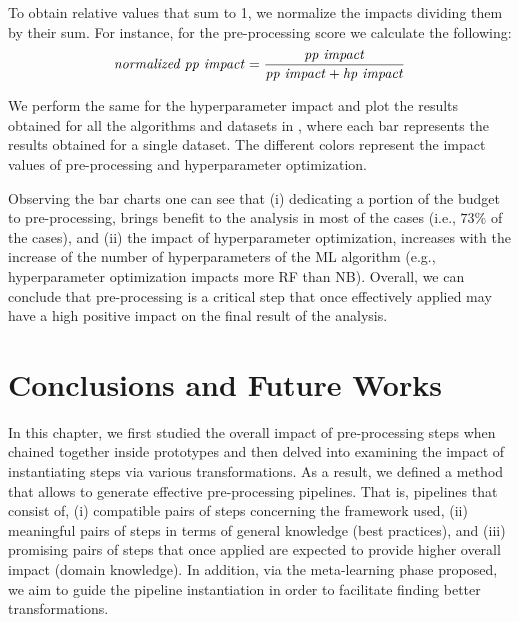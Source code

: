 To obtain relative values that sum to 1, we normalize the impacts dividing them by their sum.
For instance, for the pre-processing score we calculate the following:
\begin{equation*}
    \text{\textit{normalized pp impact}} = \frac{\text{\textit{pp impact}}}
    {\text{\textit{pp impact}} + \text{\textit{hp impact}}}
\end{equation*}


We perform the same for the hyperparameter impact and plot the results obtained for all the algorithms and datasets in , where each bar represents the results obtained for a single dataset.
The different colors represent the impact values of pre-processing and hyperparameter optimization.

Observing the bar charts one can see that (i) dedicating a portion of the budget to pre-processing, brings benefit to the analysis in most of the cases (i.e., $73\%$ of the cases), and (ii) the impact of hyperparameter optimization, increases with the increase of the number of hyperparameters of the ML algorithm (e.g., hyperparameter optimization impacts more RF than NB).
Overall, we can conclude that pre-processing is a critical step that once effectively applied may have a high positive impact on the final result of the analysis.

\section{Conclusions and Future Works}
\label{effective-sec:conclusions}

In this chapter, we first studied the overall impact of pre-processing steps when chained together inside prototypes and then delved into examining the impact of instantiating steps via various transformations.
As a result, we defined a method that allows to generate effective pre-processing pipelines.
That is, pipelines that consist of, (i) compatible pairs of steps concerning the framework used,  (ii) meaningful pairs of steps in terms of general knowledge (best practices), and (iii) promising pairs of steps that once applied are expected to provide higher overall impact (domain knowledge).
In addition, via the meta-learning phase proposed, we aim to guide the pipeline instantiation in order to facilitate finding better transformations.

